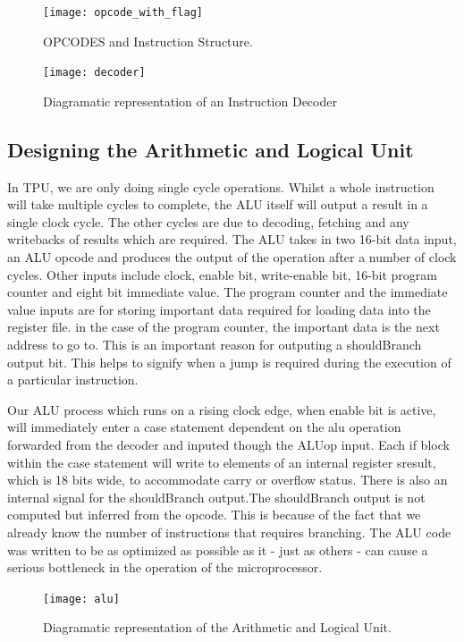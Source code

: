\begin{figure}[p]

\texttt{[image: opcode\_with\_flag]}
\centering
\caption{OPCODES and Instruction Structure.}
\centering
\label{fig:opcode_bit_flag}
\end{figure}


\begin{figure}[p]

\texttt{[image: decoder]}
\centering
\caption{Diagramatic representation of an Instruction Decoder}
\centering
\label{fig:decode}
\end{figure}



\subsection{Designing the Arithmetic and Logical Unit}

In TPU, we are only doing single cycle operations. Whilst a whole instruction will take multiple cycles to complete, the ALU itself will output a result in a single clock cycle. The other cycles are due to decoding, fetching and any writebacks of results which are required. The ALU takes in two 16-bit data input, an ALU opcode and produces the output of the operation after a number of clock cycles. 
Other inputs include clock, enable bit, write-enable bit, 16-bit program counter and eight bit immediate value. The program counter and the immediate value inputs are for storing important data required for loading data into the register file. in the case of the program counter, the important data is the next address to go to. This is an important reason for outputing a shouldBranch output bit. This helps to signify when a jump is required during the execution of a particular instruction.

Our ALU process which runs on a rising clock edge, when enable bit is active, will immediately enter a case statement dependent on the alu operation forwarded from the decoder and inputed though the ALUop input. 
Each if block within the case statement will write to elements of an internal register sresult, which is 18 bits wide, to accommodate carry or overflow status. There is also an internal signal for the shouldBranch output.The shouldBranch output is not computed but inferred from the opcode. This is because of the fact that we already know the number of instructions that requires branching. 
The ALU code was written to be as optimized as possible as it - just as others - can cause a serious bottleneck in the operation of the microprocessor.
\begin{figure}[p]
\texttt{[image: alu]}
\centering
\caption{Diagramatic representation of the Arithmetic and Logical Unit.}
\centering
\label{fig:alu}
\end{figure}



